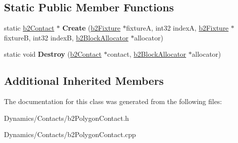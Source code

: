 \subsection*{Static Public Member Functions}
\begin{DoxyCompactItemize}
\item 
\mbox{\label{classb2PolygonContact_a65356af432d877838e14755c5eb3c553}} 
static \mbox{\hyperlink{classb2Contact}{b2\+Contact}} $\ast$ {\bfseries Create} (\mbox{\hyperlink{classb2Fixture}{b2\+Fixture}} $\ast$fixtureA, int32 indexA, \mbox{\hyperlink{classb2Fixture}{b2\+Fixture}} $\ast$fixtureB, int32 indexB, \mbox{\hyperlink{classb2BlockAllocator}{b2\+Block\+Allocator}} $\ast$allocator)
\item 
\mbox{\label{classb2PolygonContact_a0cb55fd6af6f49d36c3cda15ffd96e63}} 
static void {\bfseries Destroy} (\mbox{\hyperlink{classb2Contact}{b2\+Contact}} $\ast$contact, \mbox{\hyperlink{classb2BlockAllocator}{b2\+Block\+Allocator}} $\ast$allocator)
\end{DoxyCompactItemize}
\subsection*{Additional Inherited Members}


The documentation for this class was generated from the following files\+:\begin{DoxyCompactItemize}
\item 
Dynamics/\+Contacts/b2\+Polygon\+Contact.\+h\item 
Dynamics/\+Contacts/b2\+Polygon\+Contact.\+cpp\end{DoxyCompactItemize}
